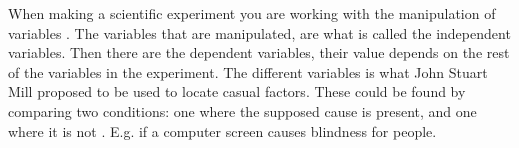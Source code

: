 When making a scientific experiment you are working with the manipulation of variables \citep[page 21]{Design}. The variables that are manipulated, are what is called the independent variables. Then there are the dependent variables, their value depends on the rest of the variables in the experiment\citep[page 21]{Design}. The different variables is what John Stuart Mill proposed to be used to locate casual factors. These could be found by comparing two conditions: one where the supposed cause is present, and one where it is not \citep[page 20]{Design}. E.g. if a computer screen causes blindness for people.